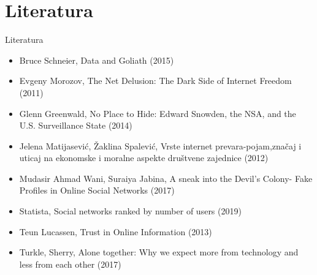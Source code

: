 \documentclass{beamer}
\begin{document}
	\section{Literatura}
		\begin{frame}{Literatura}
			\begin{itemize}
				\scriptsize
				\item Bruce Schneier, Data and Goliath (2015)
				\item Evgeny Morozov, The Net Delusion: The Dark Side of Internet Freedom (2011)
				\item Glenn Greenwald, No Place to Hide: Edward Snowden, the NSA, and the U.S. Surveillance State (2014)
				\item Jelena Matijasević, Žaklina Spalević, Vrste internet prevara-pojam,značaj i uticaj na ekonomske i moralne aspekte društvene zajednice (2012)
				\item Mudasir Ahmad Wani, Suraiya Jabina, A sneak into the Devil’s Colony- Fake Profiles in Online Social Networks (2017)
				\item Statista, Social networks ranked by number of users (2019)
				\item Teun Lucassen, Trust in Online Information (2013)
				\item Turkle, Sherry, Alone together: Why we expect more from technology and less from each other (2017)
				
			\end{itemize}
			
		\end{frame}
\end{document}
